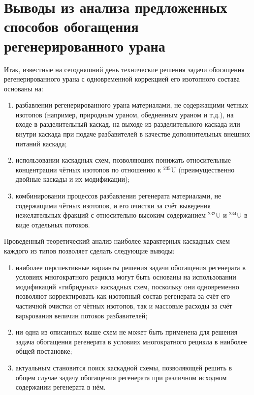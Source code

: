 \section{Выводы из анализа предложенных способов обогащения регенерированного урана}

Итак, известные на сегодняшний день технические решения задачи обогащения регенерированного урана с одновременной коррекцией его изотопного состава основаны на:
\begin{enumerate}
  \item разбавлении регенерированного урана материалами, не содержащими четных изотопов (например, природным ураном, обедненным ураном и т.д.), на входе в разделительный каскад, на выходе из разделительного каскада или внутри каскада при подаче разбавителей в качестве дополнительных внешних питаний каскада;
  \item использовании каскадных схем, позволяющих понижать относительные концентрации чётных изотопов по отношению к $^{235}$U (преимущественно двойные каскады и их модификации);
  \item комбинировании процессов разбавления регенерата материалами, не содержащими чётных изотопов, и его очистки за счёт выведения нежелательных фракций с относительно высоким содержанием $^{232}$U и $^{234}$U в виде отдельных потоков.
\end{enumerate}

Проведенный теоретический анализ наиболее характерных каскадных схем каждого из типов позволяет сделать следующие выводы:
\begin{enumerate}
  \item наиболее перспективные варианты решения задачи обогащения регенерата в условиях многократного рецикла могут быть основаны на использовании модификаций «гибридных» каскадных схем, поскольку они одновременно позволяют корректировать как изотопный состав регенерата за счёт его частичной очистки от чётных изотопов, так и массовые расходы за счёт варьрования величин потоков разбавителей;
  \item ни одна из описанных выше схем не может быть применена для решения задача обогащения регенерата в условиях многократного рецикла в наиболее общей постановке;
  \item актуальным становится поиск каскадной схемы, позволяющей решить в общем случае задачу обогащения регенерата при различном исходном содержании регенерата в нём.
\end{enumerate}
